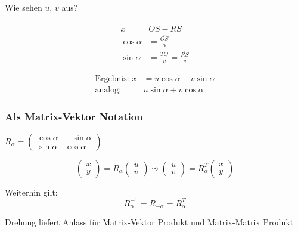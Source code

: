 Wie sehen $u$, $v$ aus?

\begin{align*}
x =& \overline{OS} - \overline{RS} \\
\cos \alpha &= \frac{\overline{OS}}{\alpha} \\
\sin \alpha &= \frac{\overline{TQ}}{v} = \frac{\overline{RS}}{v}
\end{align*}

\begin{align*}
\text{Ergebnis: } x &= u \cos \alpha - v \sin \alpha \\
\text{analog: } &u \sin \alpha + v \cos \alpha
\end{align*}

\subsubsection*{Als Matrix-Vektor Notation}

\begin{definition}
	$ R_{\alpha} =
	\begin{pmatrix}
		\cos \alpha & -\sin \alpha \\
		\sin \alpha & \cos \alpha
 	\end{pmatrix}$
\end{definition}

\begin{equation*}
	\begin{pmatrix}
		x \\
		y
 	\end{pmatrix} = R_{\alpha} 
 	\begin{pmatrix}
		u \\
		v
 	\end{pmatrix}
 	\leadsto
 		\begin{pmatrix}
		u \\
		v
 	\end{pmatrix} = R_{\alpha}^{T}
 	\begin{pmatrix}
		x \\
		y
 	\end{pmatrix}
\end{equation*}

Weiterhin gilt:
\begin{equation*}
	R_{\alpha}^{-1} = R_{-\alpha} = R_{\alpha}^{T}
\end{equation*}

\begin{note}
Drehung liefert Anlass für Matrix-Vektor Produkt und Matrix-Matrix Produkt
\end{note}

